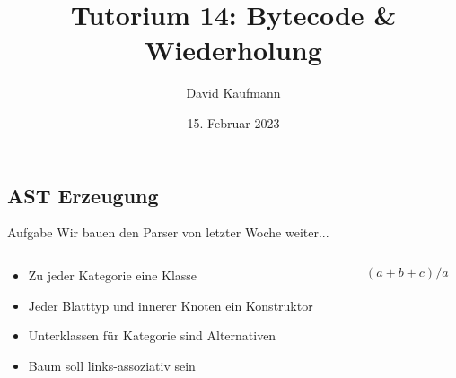 \documentclass{beamer}
\title{Tutorium 14: Bytecode \& Wiederholung}
\author{David Kaufmann}
\institute{Tutorium Programmierparadigmen am KIT}
\date{15. Februar 2023}
\begin{document}
\begin{frame}
	\titlepage
\end{frame}

\subsection{AST Erzeugung}

\begin{frame}{Aufgabe}
    Wir bauen den Parser von letzter Woche weiter...
    \begin{columns}
        \begin{column}{0.5 \textwidth}
            \begin{itemize}
                \item Zu jeder Kategorie eine Klasse
                \item Jeder Blatttyp und innerer Knoten ein Konstruktor
                \item Unterklassen für Kategorie sind Alternativen
                \item Baum soll links-assoziativ sein
            \end{itemize}
        \end{column}
        \begin{column}{0.5 \textwidth}
           $$(a+b+c)/a$$
           \begin{figure}
           \end{figure}
       \end{column}
    \end{columns}
\end{frame}
\end{document}

